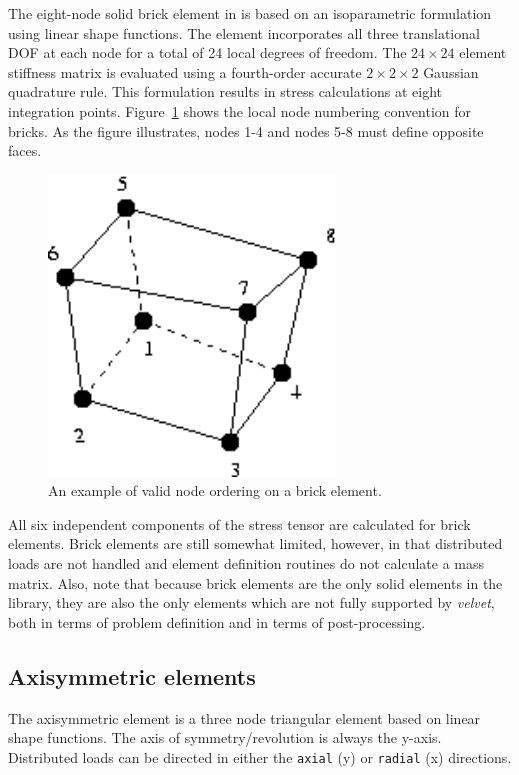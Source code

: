 The eight-node solid brick element in \felt{} is based on an isoparametric
formulation using linear shape functions.  The element incorporates all
three translational DOF at each node for a total of 24 local degrees of
freedom.  The $24 \times 24$ element stiffness matrix is evaluated using
a fourth-order accurate $2 \times 2 \times 2$ Gaussian quadrature rule.
This formulation results in stress calculations at eight integration points.
Figure~\ref{elements.brick_fig} shows the local node numbering convention
for bricks.  As the figure illustrates, nodes 1-4 and nodes 5-8 must define
opposite faces.
\begin{figure}
 \begin{center}
  \includegraphics[width=3in]{figures/brick_numbers}
 \end{center}
 \caption{An example of valid node ordering on a brick element.}
 \label{elements.brick_fig}
\end{figure} 

All six independent components of the stress tensor are calculated for brick
elements.  Brick elements are still somewhat limited, however, in that
distributed loads are not handled and element definition routines do
not calculate a mass matrix.  Also, note that because brick elements are the
only solid elements in the \felt{} library, they are also the only elements
which are not fully supported by {\em velvet}, both in terms of problem
definition and in terms of post-processing. 

\subsection{Axisymmetric elements}

The axisymmetric element is a three node triangular element based on
linear shape functions.  The axis of symmetry/revolution is always the 
y-axis.  Distributed loads can be directed in either the {\tt axial} (y)
or {\tt radial} (x) directions.

